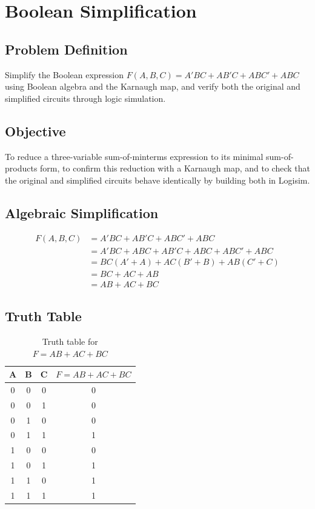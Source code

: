\documentclass[12pt]{article}
\begin{document}
\section{Boolean Simplification}

\subsection*{Problem Definition}
Simplify the Boolean expression $F(A,B,C) = A'BC + AB'C + ABC' + ABC$ using Boolean algebra and the Karnaugh map, and verify both the original and simplified circuits through logic simulation.

\subsection*{Objective}
To reduce a three-variable sum-of-minterms expression to its minimal sum-of-products form, to confirm this reduction with a Karnaugh map, and to check that the original and simplified circuits behave identically by building both in Logisim.

\subsection*{Algebraic Simplification}
\begin{align*}
F(A,B,C) &= A'BC + AB'C + ABC' + ABC \\
&= A'BC + ABC + AB'C + ABC + ABC' + ABC \\
&= BC(A' + A) + AC(B' + B) + AB(C' + C) \\
&= BC + AC + AB \\
&= AB + AC + BC
\end{align*}

\subsection*{Truth Table}
\begin{table}[H]
\centering
\begin{tabular}{ccc|c}
\toprule
A & B & C & $F = AB + AC + BC$ \\
\midrule
0 & 0 & 0 & 0 \\
0 & 0 & 1 & 0 \\
0 & 1 & 0 & 0 \\
0 & 1 & 1 & 1 \\
1 & 0 & 0 & 0 \\
1 & 0 & 1 & 1 \\
1 & 1 & 0 & 1 \\
1 & 1 & 1 & 1 \\
\bottomrule
\end{tabular}
\caption{Truth table for $F = AB + AC + BC$}
\end{table}
\end{document}
